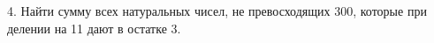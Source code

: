 4. Найти сумму всех натуральных чисел, не превосходящих 300, которые при делении на 11 дают в остатке 3.\\
